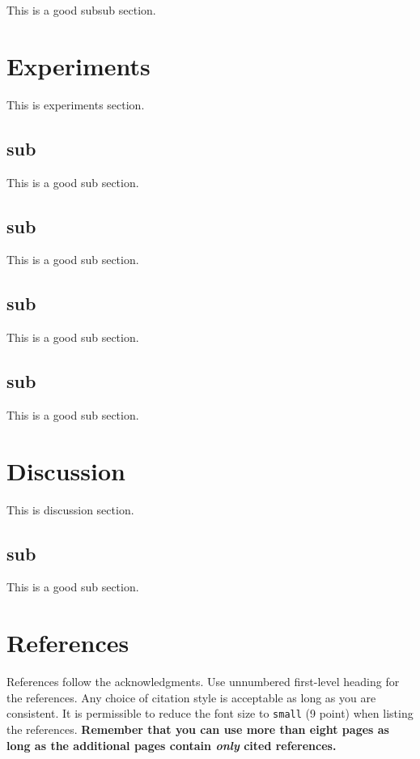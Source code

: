 \documentclass{article}
\begin{document}
This is a good subsub section.

\section{Experiments}
\label{others}

This is experiments section.

\subsection{sub}

This is a good sub section.

\subsection{sub}

This is a good sub section.

\subsection{sub}

This is a good sub section.

\subsection{sub}

This is a good sub section.

\section{Discussion}

This is discussion section.

\subsection{sub}

This is a good sub section.

\section*{References}

References follow the acknowledgments. Use unnumbered first-level heading for
the references. Any choice of citation style is acceptable as long as you are
consistent. It is permissible to reduce the font size to \verb+small+ (9 point)
when listing the references. {\bf Remember that you can use more than eight
  pages as long as the additional pages contain \emph{only} cited references.}
\medskip
\end{document}

